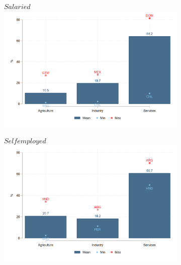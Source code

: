 \documentclass[english]{article}
\begin{document}
\begin{itemize}
\begin{figure}[htb!]
\begin{subfigure}{.5\textwidth}
  \centering
  \footnotesize{$Salaried$}
  \includegraphics[width=1\textwidth]{latex/figures/Snapshot/Salaried-sector.png}
  \label{fig:salariedsector}
\end{subfigure}%
\begin{subfigure}{.5\textwidth}
  \centering
  \footnotesize{$Self employed$}
\includegraphics[width=1\textwidth]{latex/figures/Snapshot/Self employed-sector.png}
  \label{fig:selfsector}
\end{subfigure}


\end{figure}
\end{itemize}
\end{document}
